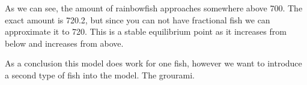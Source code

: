 \begin{flushleft}
    As we can see, the amount of rainbowfish approaches somewhere
    above 700.
    The exact amount is 720.2, but since you can not have
    fractional fish we can approximate it to 720. This is
    a stable equilibrium point as it increases from below
    and increases from above.
\end{flushleft}

\begin{flushleft}
    As a conclusion this model does work for one fish,
    however we want to introduce a second type of fish
    into the model. The grourami.
\end{flushleft}


